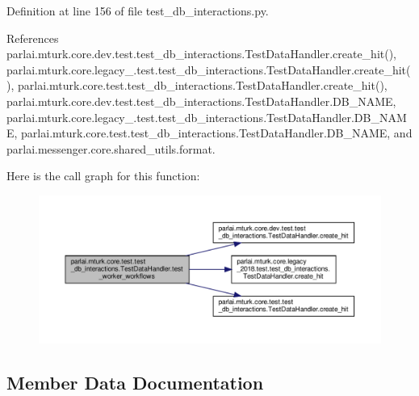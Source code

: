 Definition at line 156 of file test\+\_\+db\+\_\+interactions.\+py.



References parlai.\+mturk.\+core.\+dev.\+test.\+test\+\_\+db\+\_\+interactions.\+Test\+Data\+Handler.\+create\+\_\+hit(), parlai.\+mturk.\+core.\+legacy\+\_.\+test.\+test\+\_\+db\+\_\+interactions.\+Test\+Data\+Handler.\+create\+\_\+hit(), parlai.\+mturk.\+core.\+test.\+test\+\_\+db\+\_\+interactions.\+Test\+Data\+Handler.\+create\+\_\+hit(), parlai.\+mturk.\+core.\+dev.\+test.\+test\+\_\+db\+\_\+interactions.\+Test\+Data\+Handler.\+D\+B\+\_\+\+N\+A\+ME, parlai.\+mturk.\+core.\+legacy\+\_.\+test.\+test\+\_\+db\+\_\+interactions.\+Test\+Data\+Handler.\+D\+B\+\_\+\+N\+A\+ME, parlai.\+mturk.\+core.\+test.\+test\+\_\+db\+\_\+interactions.\+Test\+Data\+Handler.\+D\+B\+\_\+\+N\+A\+ME, and parlai.\+messenger.\+core.\+shared\+\_\+utils.\+format.

Here is the call graph for this function\+:
\nopagebreak
\begin{figure}[H]
\begin{center}
\leavevmode
\includegraphics[width=350pt]{classparlai_1_1mturk_1_1core_1_1test_1_1test__db__interactions_1_1TestDataHandler_af40b559a9abdf86a2a62b8cdff096b74_cgraph}
\end{center}
\end{figure}


\subsection{Member Data Documentation}
\mbox{\label{classparlai_1_1mturk_1_1core_1_1test_1_1test__db__interactions_1_1TestDataHandler_a89040a04e0888485d0ccf4f71a91ea9b}} 
